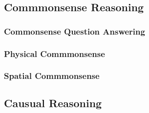 \subsection{Commmonsense Reasoning}

\subsubsection{Commonsense Question Answering}




\subsubsection{Physical Commmonsense}



\subsubsection{Spatial Commmonsense}




\subsection{Causual Reasoning}




